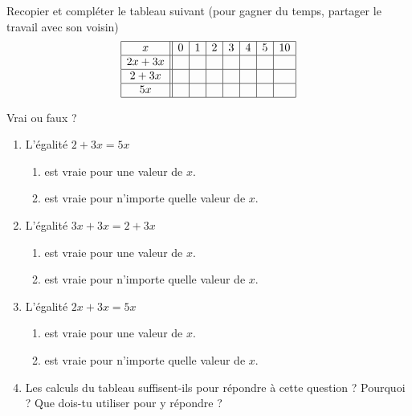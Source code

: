 
\begin{exercice}\label{exosmath-0781}

    Recopier et compléter le tableau suivant (pour gagner du temps, partager le travail avec son voisin)
    \begin{equation*}
        \begin{array}[]{|c||c|c|c|c|c|c|c|}
            \hline
            x&0&1&2&3&4&5&10\\
            \hline
            2x+3x&&&&&&&\\
            \hline
            2+3x&&&&&&&\\
            \hline
            5x&&&&&&&\\
            \hline
        \end{array}
    \end{equation*}

    Vrai ou faux ?

    \begin{enumerate}
        \item
            L'égalité \( 2+3x=5x\)
            \begin{enumerate}
                    
        \item
             est vraie pour une valeur de $x$.
         \item
            est vraie pour n'importe quelle valeur de $x$.
            \end{enumerate}
        \item
            L'égalité \( 3x+3x=2+3x\)
            \begin{enumerate}
                \item
 est vraie pour une valeur de $x$.
 \item
est vraie pour n'importe quelle valeur de $x$.
            \end{enumerate}
        \item
            L'égalité \( 2x+3x=5x\)
            \begin{enumerate}
                \item
                    
 est vraie pour une valeur de $x$.
 \item
     est vraie pour n'importe quelle valeur de $x$.          
     \end{enumerate}
        \item

Les calculs du tableau suffisent-ils pour répondre à cette question ? Pourquoi ?
Que dois-tu utiliser pour y répondre ?


    \end{enumerate}

\end{exercice}
